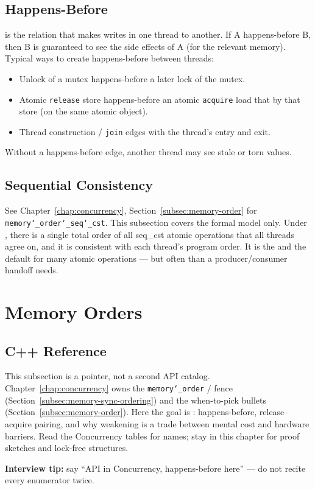 \subsection{Happens-Before}
\label{subsec:happens-before}
 is the relation that makes writes in one thread  
to another. If A happens-before B, then B is guaranteed to see the side effects of A 
(for the relevant memory).
\newline
Typical ways to create happens-before between threads:
\begin{itemize}
    \item Unlock of a mutex happens-before a later lock of the  mutex.
    \item Atomic \texttt{release} store happens-before an atomic \texttt{acquire} load that 
           by that store (on the same atomic object).
    \item Thread construction / \texttt{join} edges with the thread's entry and exit.
\end{itemize}
Without a happens-before edge, another thread may see stale or torn values.

\subsection{Sequential Consistency}
\label{subsec:sequential-consistency}
See Chapter~\ref{chap:concurrency}, Section~\ref{subsec:memory-order} for \texttt{memory\char`_order\char`_seq\char`_cst}. 
This subsection covers the formal model only.
\newline
Under , there is a single total order of all seq\_cst 
atomic operations that all threads agree on, and it is consistent with each thread's 
program order. It is the  and the default for many atomic 
operations --- but often  than a producer/consumer handoff needs.

\section{Memory Orders}
\label{sec:memory-orders-theory}

\subsection{C++ Reference}
\label{subsec:memory-order-reference}
This subsection is a pointer, not a second API catalog. Chapter~\ref{chap:concurrency} 
owns the \texttt{memory\char`_order} / fence  
(Section~\ref{subsec:memory-sync-ordering}) and the when-to-pick bullets 
(Section~\ref{subsec:memory-order}).
\newline
Here the goal is : happens-before, release--acquire pairing, and 
why weakening is a trade between mental cost and hardware barriers. Read the 
Concurrency tables for names; stay in this chapter for proof sketches and lock-free 
structures.
\par\noindent\textbf{Interview tip:} say ``API in Concurrency, happens-before here'' --- 
do not recite every enumerator twice.

